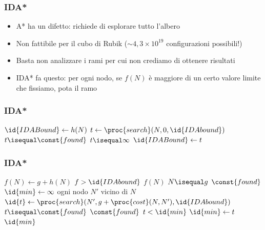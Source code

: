 \documentclass{beamer}
\begin{document}
\begin{frame}
\frametitle{IDA*}
\begin{itemize}
\item A* ha un difetto: richiede di esplorare tutto l'albero
\item Non fattibile per il cubo di Rubik ($\sim 4,3\times 10^{19}$
configurazioni possibili!)
\item Basta non analizzare i rami per cui non crediamo di ottenere risultati
\item IDA* fa questo: per ogni nodo, se $f(N)$ è maggiore di un certo valore
limite che fissiamo, pota il ramo
\end{itemize}
\end{frame}

\begin{frame}
\frametitle{IDA*}
\begin{codebox}
\li $\id{IDABound}\gets h(N)$
\li \While {}
\li \Do
        $t\gets\proc{search}(N, 0, \id{IDAbound})$
\li     \If $t\isequal\const{found}$
\li     \Then
            \Return {}
        \End
\li     \If $t\isequal\infty$
\li     \Then
            \Return {}
        \End
\li     $\id{IDABound}\gets t$
    \End
\end{codebox}
\end{frame}

\begin{frame}
\frametitle{IDA*}
\begin{codebox}
\li $f(N)\gets g + h(N)$
\li \If $f > \id{IDAbound}$
\li \Then
        \Return $f(N)$
    \End
\li \If $N\isequal g$
\li \Then
        \Return $\const{found}$
    \End
\li $\id{min}\gets\infty$
\li \For ogni nodo $N'$ vicino di $N$
\li \Do
        $\id{t}\gets\proc{search}(N', g + \proc{cost}(N, N'), \id{IDAbound})$
\li     \If $t\isequal\const{found}$
\li     \Then
            \Return $\const{found}$
        \End
\li     \If $t < \id{min}$
\li     \Then
            $\id{min}\gets t$
        \End
    \End
\li \Return $\id{min}$
\end{codebox}
\end{frame}
\end{document}
